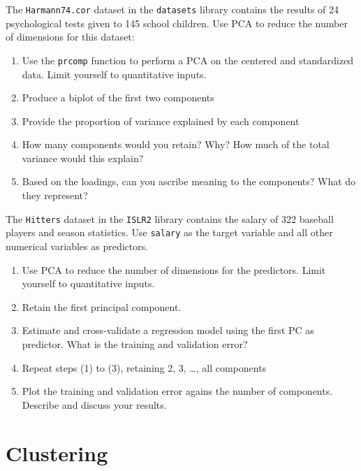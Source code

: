 \begin{withcode}
\begin{exerciseboxcomputer}

The \texttt{Harmann74.cor} dataset in the \texttt{datasets} library contains the results of 24 psychological tests given to 145 school children. 
Use PCA to reduce the number of dimensions for this dataset:
\begin{enumerate}
   \item Use the \texttt{prcomp} function to perform a PCA on the centered and standardized data. Limit yourself to quantitative inputs.
   \item Produce a biplot of the first two components
   \item Provide the proportion of variance explained by each component
   \item How many components would you retain? Why? How much of the total variance would this explain?
   \item Based on the loadings, can you ascribe meaning to the components? What do they represent?
\end{enumerate}
\end{exerciseboxcomputer}

\begin{exerciseboxcomputer}

The \texttt{Hitters} dataset in the \texttt{ISLR2} library contains the salary of 322 baseball players and season statistics. Use \texttt{salary} as the target variable and all other numerical variables as predictors. 

\begin{enumerate}
   \item Use PCA to reduce the number of dimensions for the predictors. Limit yourself to quantitative inputs.
   \item Retain the first principal component.
   \item Estimate and cross-validate a regression model using the first PC as predictor. What is the training and validation error?
   \item Repeat steps (1) to (3), retaining 2, 3, \ldots, all components
   \item Plot the training and validation error agains the number of components. Describe and discuss your results.
\end{enumerate}
\end{exerciseboxcomputer}
\end{withcode}

\section{Clustering}

